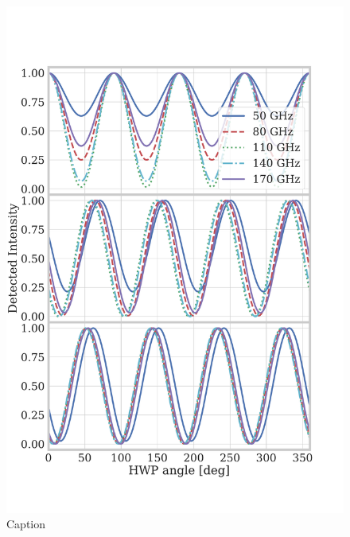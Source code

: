 \begin{figure}[!t]
    \centering
    \includegraphics[width=0.6\linewidth, trim=0cm 3cm 2cm 5cm, clip]{PolarizationModulation/Figures/ahwp_detector_modulation.pdf}
    \caption{Caption}
    \label{fig:ahwp_detector_output}
\end{figure}

